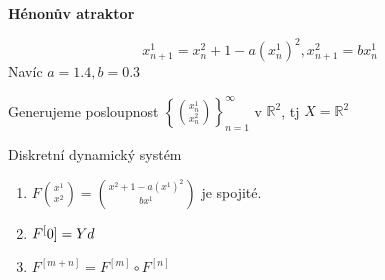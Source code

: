 \documentclass[../main.tex]{subfiles}
\begin{document}
\begin{example}
    \textbf{Hénonův atraktor}

    \begin{equation}
        x^1_{n+1} = x^2_n + 1 - a\left(x^1_n\right)^2, x^2_{n+1} = bx^1_n
    \end{equation}
    Navíc $a=1.4, b=0.3$

    Generujeme posloupnost $\left\{\binom{x_n^1}{x_n^2}\right\}_{n=1}^\infty$ v $\mathbb{R}^2$,
    tj $X = \mathbb{R}^2$

    Diskretní dynamický systém
    \begin{enumerate}
        \item $F\binom{x^1}{x^2} = \binom{  x^2 + 1 - a(x^1)^2 }{bx^1}$ je spojité.
        \item $F^[0] = Yd$
        \item $F^{[m+n]} = F^{[m]}\circ F^{[n]}$
    \end{enumerate}

\end{example}
\end{document}
